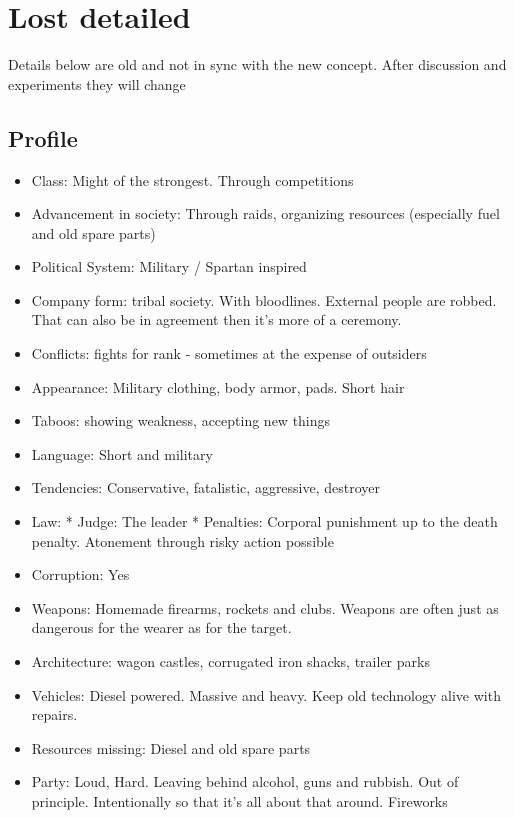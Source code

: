 \section {Lost detailed}


\begin{warning}
    Details below are old and not in sync with the new concept. After discussion and experiments they will change
\end{warning}


\subsection{Profile}
\begin{itemize}
    \item Class: Might of the strongest. Through competitions
    \item Advancement in society: Through raids, organizing resources (especially fuel and old spare parts)
    \item Political System: Military / Spartan inspired
    \item Company form: tribal society. With bloodlines. External people are robbed. That can also be in agreement then it's more of a ceremony.
    \item Conflicts: fights for rank - sometimes at the expense of outsiders
    \item Appearance: Military clothing, body armor, pads. Short hair
    \item Taboos: showing weakness, accepting new things
    \item Language: Short and military
    \item Tendencies: Conservative, fatalistic, aggressive, destroyer
    \item Law: * Judge: The leader * Penalties: Corporal punishment up to the death penalty. Atonement through risky action possible
    \item Corruption: Yes
    \item Weapons: Homemade firearms, rockets and clubs. Weapons are often just as dangerous for the wearer as for the target.
    \item Architecture: wagon castles, corrugated iron shacks, trailer parks
    \item Vehicles: Diesel powered. Massive and heavy. Keep old technology alive with repairs.
    \item Resources missing: Diesel and old spare parts
    \item Party: Loud, Hard. Leaving behind alcohol, guns and rubbish. Out of principle. Intentionally so that it's all about that around. Fireworks

\end{itemize}
